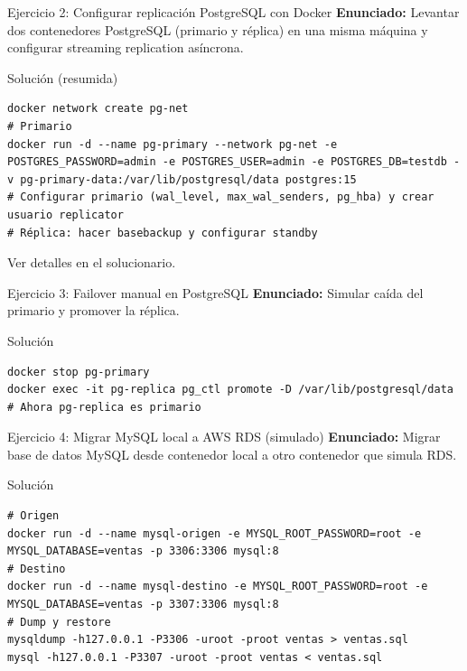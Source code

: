 \documentclass[aspectratio=169, 10pt, xcolor=table]{beamer}
\begin{document}
\begin{frame}[fragile]{Ejercicio 2: Configurar replicación PostgreSQL con Docker}
    \textbf{Enunciado:} Levantar dos contenedores PostgreSQL (primario y réplica) en una misma máquina y configurar streaming replication asíncrona.
    \begin{block}{Solución (resumida)}
        \begin{lstlisting}[style=bashstyle]
docker network create pg-net
# Primario
docker run -d --name pg-primary --network pg-net -e POSTGRES_PASSWORD=admin -e POSTGRES_USER=admin -e POSTGRES_DB=testdb -v pg-primary-data:/var/lib/postgresql/data postgres:15
# Configurar primario (wal_level, max_wal_senders, pg_hba) y crear usuario replicator
# Réplica: hacer basebackup y configurar standby
        \end{lstlisting}
        Ver detalles en el solucionario.
    \end{block}
\end{frame}

\begin{frame}[fragile]{Ejercicio 3: Failover manual en PostgreSQL}
    \textbf{Enunciado:} Simular caída del primario y promover la réplica.
    \begin{block}{Solución}
        \begin{lstlisting}[style=bashstyle]
docker stop pg-primary
docker exec -it pg-replica pg_ctl promote -D /var/lib/postgresql/data
# Ahora pg-replica es primario
        \end{lstlisting}
    \end{block}
\end{frame}

\begin{frame}[fragile]{Ejercicio 4: Migrar MySQL local a AWS RDS (simulado)}
    \textbf{Enunciado:} Migrar base de datos MySQL desde contenedor local a otro contenedor que simula RDS.
    \begin{block}{Solución}
        \begin{lstlisting}[style=bashstyle]
# Origen
docker run -d --name mysql-origen -e MYSQL_ROOT_PASSWORD=root -e MYSQL_DATABASE=ventas -p 3306:3306 mysql:8
# Destino
docker run -d --name mysql-destino -e MYSQL_ROOT_PASSWORD=root -e MYSQL_DATABASE=ventas -p 3307:3306 mysql:8
# Dump y restore
mysqldump -h127.0.0.1 -P3306 -uroot -proot ventas > ventas.sql
mysql -h127.0.0.1 -P3307 -uroot -proot ventas < ventas.sql
        \end{lstlisting}
    \end{block}
\end{frame}
\end{document}
